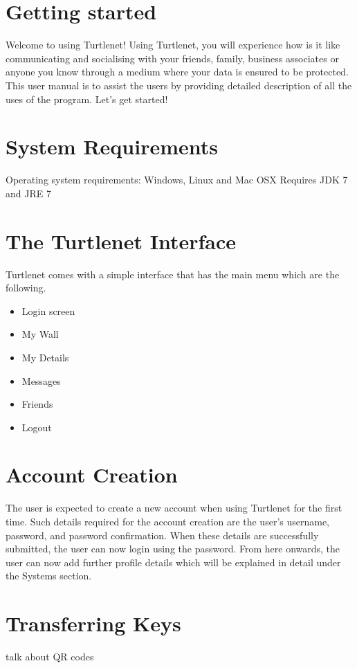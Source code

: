 \section{Getting started}
Welcome to using Turtlenet! Using Turtlenet, you will experience how is it like communicating and socialising with your friends, family, business associates or anyone you know through a medium where your data is ensured to be protected. This user manual is to assist the users by providing detailed description of all the uses of the program. Let's get started!

\section{System Requirements}
Operating system requirements: Windows, Linux and Mac OSX
Requires JDK 7 and JRE 7

\section{The Turtlenet Interface}
Turtlenet comes with a simple interface that has the main menu which are the following.
\begin{itemize}
\item Login screen
\item My Wall
\item My Details
\item Messages
\item Friends
\item Logout
\end{itemize}

\section{Account Creation}
The user is expected to create a new account when using Turtlenet for the first time. Such details required for the account creation are the user's username, password, and password confirmation. When these details are successfully submitted, the user can now login using the password. From here onwards, the user can now add further profile details which will be explained in detail under the Systems section. 

\section{Transferring Keys}
talk about QR codes